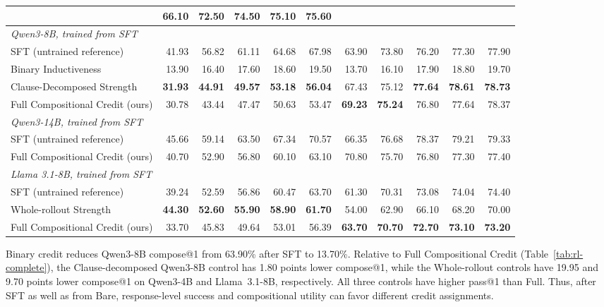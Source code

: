 \begin{table}[H]
\begin{tabular}{lrrrrrrrrrr}
  & \textbf{66.10} & \textbf{72.50} & \textbf{74.50} & \textbf{75.10} & \textbf{75.60} \\
\midrule
\multicolumn{11}{l}{\textit{Qwen3-8B, trained from SFT}} \\
SFT (untrained reference)
  & 41.93 & 56.82 & 61.11 & 64.68 & 67.98
  & 63.90 & 73.80 & 76.20 & 77.30 & 77.90 \\
Binary Inductiveness
  & 13.90 & 16.40 & 17.60 & 18.60 & 19.50
  & 13.70 & 16.10 & 17.90 & 18.80 & 19.70 \\
Clause-Decomposed Strength
  & \textbf{31.93} & \textbf{44.91} & \textbf{49.57} & \textbf{53.18} & \textbf{56.04}
  & 67.43 & 75.12 & \textbf{77.64} & \textbf{78.61} & \textbf{78.73} \\
Full Compositional Credit (ours)
  & 30.78 & 43.44 & 47.47 & 50.63 & 53.47
  & \textbf{69.23} & \textbf{75.24} & 76.80 & 77.64 & 78.37 \\
\midrule
\multicolumn{11}{l}{\textit{Qwen3-14B, trained from SFT}} \\
SFT (untrained reference)
  & 45.66 & 59.14 & 63.50 & 67.34 & 70.57
  & 66.35 & 76.68 & 78.37 & 79.21 & 79.33 \\
Full Compositional Credit (ours)
  & 40.70 & 52.90 & 56.80 & 60.10 & 63.10
  & 70.80 & 75.70 & 76.80 & 77.30 & 77.40 \\
\midrule
\multicolumn{11}{l}{\textit{Llama 3.1-8B, trained from SFT}} \\
SFT (untrained reference)
  & 39.24 & 52.59 & 56.86 & 60.47 & 63.70
  & 61.30 & 70.31 & 73.08 & 74.04 & 74.40 \\
Whole-rollout Strength
  & \textbf{44.30} & \textbf{52.60} & \textbf{55.90} & \textbf{58.90} & \textbf{61.70}
  & 54.00 & 62.90 & 66.10 & 68.20 & 70.00 \\
Full Compositional Credit (ours)
  & 33.70 & 45.83 & 49.64 & 53.01 & 56.39
  & \textbf{63.70} & \textbf{70.70} & \textbf{72.70} & \textbf{73.10} & \textbf{73.20} \\
\bottomrule
\end{tabular}
\end{table}

Binary credit reduces Qwen3-8B compose@1 from 63.90\% after SFT to 13.70\%.
Relative to Full Compositional Credit (Table~\ref{tab:rl-complete}), the
Clause-decomposed Qwen3-8B control has 1.80 points lower compose@1, while the
Whole-rollout controls have 19.95 and 9.70 points lower compose@1 on Qwen3-4B
and Llama~3.1-8B, respectively.  All three controls have higher pass@1 than
Full.  Thus, after SFT as well as from Bare, response-level success and
compositional utility can favor different credit assignments.


